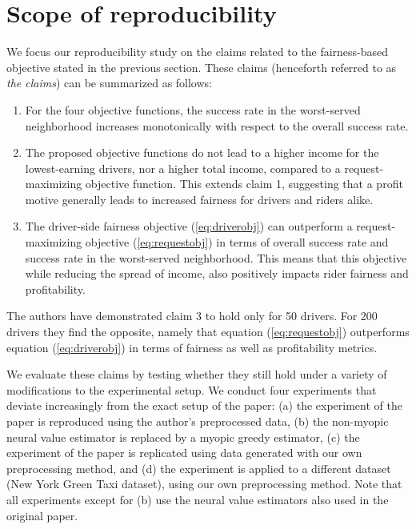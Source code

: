 \section{Scope of reproducibility}
\label{sec:claims}

We focus our reproducibility study on the claims related to the fairness-based objective stated in the previous section. These claims (henceforth referred to as \textit{the claims}) can be summarized as follows:

\begin{enumerate}
    \item For the four objective functions, the success rate in the worst-served neighborhood increases monotonically with respect to the overall success rate.

    \item The proposed objective functions do not lead to a higher income for the lowest-earning drivers, nor a higher total income, compared to a request-maximizing objective function. This extends claim 1, suggesting that a profit motive generally leads to increased fairness for drivers and riders alike.

    \item The driver-side fairness objective (\ref{eq:driverobj}) can outperform a request-maximizing objective (\ref{eq:requestobj}) in terms of overall success rate and success rate in the worst-served neighborhood. This means that this objective while reducing the spread of income, also positively impacts rider fairness and profitability.
\end{enumerate}

The authors have demonstrated claim 3 to hold only for 50 drivers. For 200 drivers they find the opposite, namely that equation (\ref{eq:requestobj}) outperforms equation (\ref{eq:driverobj}) in terms of fairness as well as profitability metrics.

We evaluate these claims by testing whether they still hold under a variety of modifications to the experimental setup. We conduct four experiments that deviate increasingly from the exact setup of the paper: (a) the experiment of the paper is reproduced using the author's preprocessed data, (b) the non-myopic neural value estimator is replaced by a myopic greedy estimator, (c) the experiment of the paper is replicated using data generated with our own preprocessing method, and (d) the experiment is applied to a different dataset (New York Green Taxi dataset), using our own preprocessing method. Note that all experiments except for (b) use the neural value estimators also used in the original paper.


